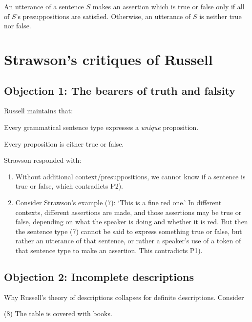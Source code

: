\begin{definition}
An utterance of a sentence $S$ makes an assertion which is true or false only if all of $S$'s presuppositions are satisfied. Otherwise, an utterance of $S$ is neither true nor false.
\end{definition}

\section{Strawson's critiques of Russell}

\subsection*{Objection 1: The bearers of truth and falsity}

Russell maintains that:
\begin{premises}
  \item[P1)] Every grammatical sentence type expresses a \emph{unique} proposition.
  \item[P2)] Every proposition is either true or false.
\end{premises}

Strawson responded with:
\begin{enumerate}
  \item Without additional context/presuppositions, we cannot know if a sentence is true or false, which contradicts P2).
  \item Consider Strawson's example (7): `This is a fine red one.' In different contexts, different assertions are made, and those assertions may be true or false, depending on what the speaker is doing and whether it is red. But then the sentence type (7) cannot be said to express something true or false, but rather an utterance of that sentence, or rather a speaker's use of a token of that sentence type to make an assertion. This contradicts P1).
\end{enumerate}

\subsection*{Objection 2: Incomplete descriptions}

Why Russell's theory of descriptions collapses for definite descriptions. Consider

\begin{example}
(8) The table is covered with books.
\end{example}

